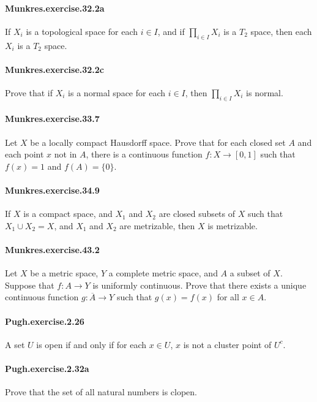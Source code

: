 \documentclass{article}
\begin{document}
\paragraph{Munkres.exercise.32.2a} If $X_i$ is a topological space for each $i\in I$, and if $\prod_{i\in I}X_i$ is a $T_2$ space, then each $X_i$ is a $T_2$ space.

\paragraph{Munkres.exercise.32.2c} Prove that if $X_i$ is a normal space for each $i\in I$, then $\prod_{i\in I}X_i$ is normal.

\paragraph{Munkres.exercise.33.7} Let $X$ be a locally compact Hausdorff space. Prove that for each closed set $A$ and each point $x$ not in $A$, there is a continuous function $f:X\to [0,1]$ such that $f(x)=1$ and $f(A)=\{0\}$.

\paragraph{Munkres.exercise.34.9} If $X$ is a compact space, and $X_1$ and $X_2$ are closed subsets of $X$ such that $X_1\cup X_2=X$, and $X_1$ and $X_2$ are metrizable, then $X$ is metrizable.

\paragraph{Munkres.exercise.43.2} Let $X$ be a metric space, $Y$ a complete metric space, and $A$ a subset of $X$. Suppose that $f:A\to Y$ is uniformly continuous. Prove that there exists a unique continuous function $g:\overline{A}\to Y$ such that $g(x)=f(x)$ for all $x\in A$.

\paragraph{Pugh.exercise.2.26} A set $U$ is open if and only if for each $x\in U$, $x$ is not a cluster point of $U^c$.

\paragraph{Pugh.exercise.2.32a} Prove that the set of all natural numbers is clopen.
\end{document}
